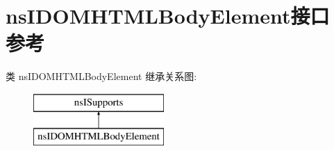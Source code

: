 \hypertarget{interfacens_i_d_o_m_h_t_m_l_body_element}{}\section{ns\+I\+D\+O\+M\+H\+T\+M\+L\+Body\+Element接口 参考}
\label{interfacens_i_d_o_m_h_t_m_l_body_element}
类 ns\+I\+D\+O\+M\+H\+T\+M\+L\+Body\+Element 继承关系图\+:\begin{figure}[H]
\begin{center}
\leavevmode
\includegraphics[height=2.000000cm]{interfacens_i_d_o_m_h_t_m_l_body_element}
\end{center}
\end{figure}
